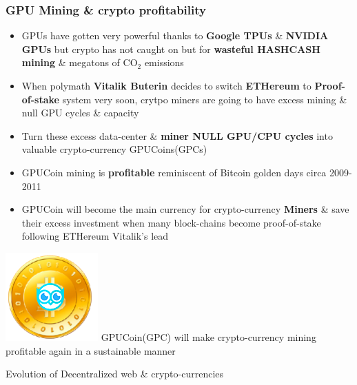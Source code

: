 \documentclass[10pt,handout]{beamer}
\begin{document}
\begin{frame}[t]\frametitle{GPU Mining \& crypto profitability}
\begin{itemize}[<+-| alert@+>]
\item GPUs have gotten very powerful thanks to \textbf{Google TPUs} \& \textbf{NVIDIA GPUs} but crypto has not caught on but for \textbf{wasteful HASHCASH mining} \& megatons of CO$_2$ emissions
\item When polymath \textbf{Vitalik Buterin} decides to switch \textbf{ETHereum} to \textbf{Proof-of-stake} system very soon, crytpo miners are going to have excess mining \& null GPU cycles \& capacity
\item Turn these excess data-center \& \textbf{miner NULL GPU/CPU cycles} into valuable crypto-currency GPUCoins(GPCs)
 \item GPUCoin mining is \textbf{profitable} reminiscent of Bitcoin golden days circa 2009-2011
\item GPUCoin will become the main currency for crypto-currency \textbf{Miners} \& save their excess investment when many block-chains become proof-of-stake following ETHereum Vitalik's lead
\end{itemize}
 \pause
 \includegraphics[scale=0.1]{static/hootcoin} 
\Large{ GPUCoin(GPC) will make crypto-currency mining profitable again in a sustainable manner}

\end{frame}

\begin{frame}[t]{Evolution of Decentralized web \& crypto-currencies}
 
\end{frame} 
\end{document}
